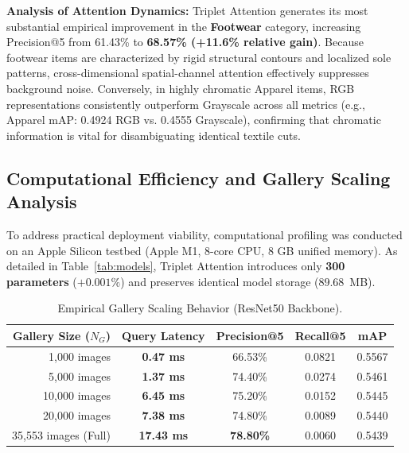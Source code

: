 \documentclass[runningheads]{llncs}
\begin{document}
\noindent\textbf{Analysis of Attention Dynamics:} Triplet Attention generates its most substantial empirical improvement in the \textbf{Footwear} category, increasing Precision@5 from 61.43\% to \textbf{68.57\% (+11.6\% relative gain)}. Because footwear items are characterized by rigid structural contours and localized sole patterns, cross-dimensional spatial-channel attention effectively suppresses background noise. Conversely, in highly chromatic Apparel items, RGB representations consistently outperform Grayscale across all metrics (e.g., Apparel mAP: 0.4924 RGB vs. 0.4555 Grayscale), confirming that chromatic information is vital for disambiguating identical textile cuts.

\subsection{Computational Efficiency and Gallery Scaling Analysis}
To address practical deployment viability, computational profiling was conducted on an Apple Silicon testbed (Apple M1, 8-core CPU, 8 GB unified memory). As detailed in Table~\ref{tab:models}, Triplet Attention introduces only \textbf{300 parameters} ($+0.001\%$) and preserves identical model storage ($89.68$~MB). 

\begin{table}[t]
\centering
\caption{Empirical Gallery Scaling Behavior (ResNet50 Backbone).}
\label{tab:scaling}
\begin{tabular}{rcccc}
\toprule
\textbf{Gallery Size ($N_G$)} & \textbf{Query Latency} & \textbf{Precision@5} & \textbf{Recall@5} & \textbf{mAP} \\
\midrule
1,000 images                  & \textbf{0.47 ms}       & 66.53\%              & 0.0821            & 0.5567 \\
5,000 images                  & \textbf{1.37 ms}       & 74.40\%              & 0.0274            & 0.5461 \\
10,000 images                 & \textbf{6.45 ms}       & 75.20\%              & 0.0152            & 0.5445 \\
20,000 images                 & \textbf{7.38 ms}       & 74.80\%              & 0.0089            & 0.5440 \\
35,553 images (Full)          & \textbf{17.43 ms}      & \textbf{78.80\%}     & 0.0060            & 0.5439 \\
\bottomrule
\end{tabular}
\end{table}
\end{document}
